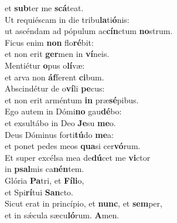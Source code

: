 \oddverse et \textbf{sub}ter me \textbf{scá}teat.\\
\evenverse Ut requiéscam in die tribu\textbf{la}ti\textbf{ó}nis:~\*\\
\evenverse ut ascéndam ad pópulum ac\textbf{cín}ctum \textbf{no}strum.\\
\oddverse Ficus enim \textbf{non} flo\textbf{ré}bit:~\*\\
\oddverse et non erit \textbf{ger}men in \textbf{ví}neis.\\
\evenverse Mentiétur \textbf{o}pus o\textbf{lí}væ:~\*\\
\evenverse et arva non \textbf{áf}ferent \textbf{ci}bum.\\
\oddverse Abscindétur de o\textbf{ví}li \textbf{pe}cus:~\*\\
\oddverse et non erit arméntum \textbf{in} præ\textbf{sé}pibus.\\
\evenverse Ego autem in Dómi\textbf{no} gau\textbf{dé}bo:~\*\\
\evenverse et exsultábo in Deo \textbf{Je}su \textbf{me}o.\\
\oddverse Deus Dóminus forti\textbf{tú}do \textbf{me}a:~\*\\
\oddverse et ponet pedes meos \textbf{qua}si cer\textbf{vó}rum.\\
\evenverse Et super excélsa mea de\textbf{dú}cet me \textbf{vi}ctor~\*\\
\evenverse in \textbf{psal}mis ca\textbf{nén}tem.\\
\oddverse Glória \textbf{Pa}tri, et \textbf{Fí}\textbf{li}o,~\*\\
\oddverse et Spi\textbf{rí}tui \textbf{San}cto.\\
\evenverse Sicut erat in princípio, et \textbf{nunc}, et \textbf{sem}per,~\*\\
\evenverse et in sǽcula sæcu\textbf{ló}rum. \textbf{A}men.\\

